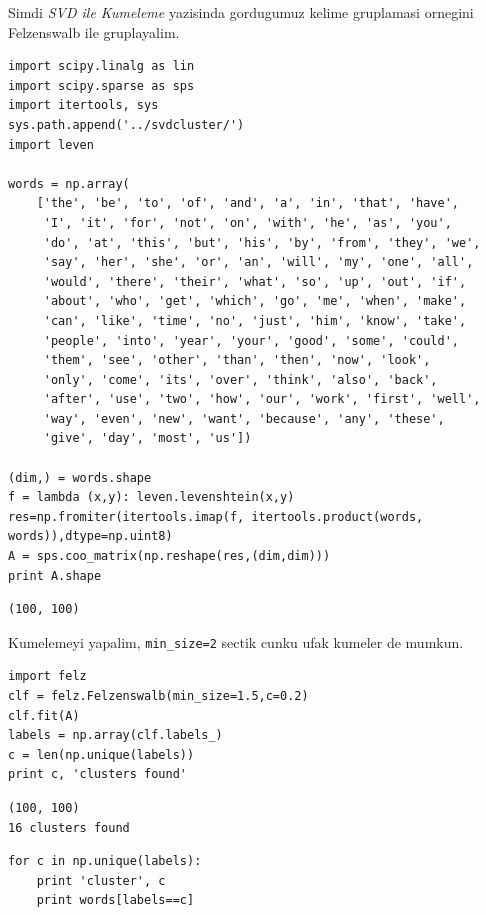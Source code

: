 \documentclass[12pt,fleqn]{article}\usepackage{../common}
\begin{document}
Simdi {\em SVD ile Kumeleme} yazisinda gordugumuz kelime gruplamasi ornegini
Felzenswalb ile gruplayalim. 

\begin{verbatim}
import scipy.linalg as lin
import scipy.sparse as sps
import itertools, sys
sys.path.append('../svdcluster/')
import leven

words = np.array(
    ['the', 'be', 'to', 'of', 'and', 'a', 'in', 'that', 'have',
     'I', 'it', 'for', 'not', 'on', 'with', 'he', 'as', 'you',
     'do', 'at', 'this', 'but', 'his', 'by', 'from', 'they', 'we',
     'say', 'her', 'she', 'or', 'an', 'will', 'my', 'one', 'all',
     'would', 'there', 'their', 'what', 'so', 'up', 'out', 'if',
     'about', 'who', 'get', 'which', 'go', 'me', 'when', 'make',
     'can', 'like', 'time', 'no', 'just', 'him', 'know', 'take',
     'people', 'into', 'year', 'your', 'good', 'some', 'could',
     'them', 'see', 'other', 'than', 'then', 'now', 'look',
     'only', 'come', 'its', 'over', 'think', 'also', 'back',
     'after', 'use', 'two', 'how', 'our', 'work', 'first', 'well',
     'way', 'even', 'new', 'want', 'because', 'any', 'these',
     'give', 'day', 'most', 'us'])

(dim,) = words.shape
f = lambda (x,y): leven.levenshtein(x,y)
res=np.fromiter(itertools.imap(f, itertools.product(words, words)),dtype=np.uint8)
A = sps.coo_matrix(np.reshape(res,(dim,dim)))
print A.shape
\end{verbatim}

\begin{verbatim}
(100, 100)
\end{verbatim}

Kumelemeyi yapalim, \verb!min_size=2! sectik cunku ufak kumeler de mumkun.

\begin{verbatim}
import felz
clf = felz.Felzenswalb(min_size=1.5,c=0.2)
clf.fit(A)
labels = np.array(clf.labels_)
c = len(np.unique(labels))
print c, 'clusters found'
\end{verbatim}

\begin{verbatim}
(100, 100)
16 clusters found
\end{verbatim}

\begin{verbatim}
for c in np.unique(labels):
    print 'cluster', c
    print words[labels==c]
\end{verbatim}
\end{document}
